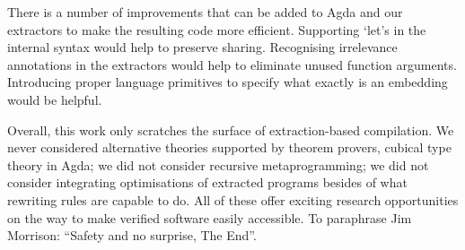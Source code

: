 There is a number of improvements that can be added to
Agda and our extractors to make the resulting code more
efficient.  Supporting `let's in the internal syntax
would help to preserve sharing.  Recognising irrelevance
annotations in the extractors would help to eliminate
unused function arguments.  Introducing proper language
primitives to specify what exactly is an embedding would
be helpful.


Overall, this work only scratches the surface of extraction-based
compilation.  We never considered alternative theories supported
by theorem provers, \eg{} cubical type theory in Agda; we did not
consider recursive metaprogramming; we did not consider integrating
optimisations of extracted programs besides of what rewriting rules
are capable to do.  All of these offer exciting research opportunities
on the way to make verified software easily accessible.
To paraphrase Jim Morrison: ``Safety and no surprise, The End''.
